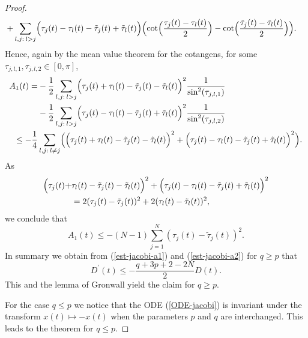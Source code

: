 \documentclass[10pt,a4paper]{amsart}
\begin{document}
\begin{proof}
\begin{align}
+&
  \sum_{l,j: \> l> j}\Bigl( \tau_j(t)- \tau_l(t) -\tilde \tau_j(t)+\tilde \tau_l(t)\Bigr)
 \Bigl(\cot\Bigl(\frac{\tau_j(t)-\tau_l(t)}{2}\Bigr)-
\cot\Bigl(\frac{\tilde \tau_j(t)-\tilde \tau_l(t)}{2}\Bigr)\Bigr).\notag
\end{align}
Hence, again by the mean value theorem for the cotangens, for some $\tau_{j,l,1},\tau_{j,l,2}\in [0,\pi]$,
\begin{align}
  A_1(t)= & -\frac{1}{2} \sum_{l,j: \> l>j}\Bigl( \tau_j(t)+ \tau_l(t) -\tilde \tau_j(t)-\tilde \tau_l(t)\Bigr)^2\frac{1}{\sin^2( \tau_{j,l,1})}
\notag\\
&-\frac{1}{2} \sum_{l,j: \> l>j}\Bigl( \tau_j(t)- \tau_l(t) -\tilde \tau_j(t)+\tilde \tau_l(t)\Bigr)^2\frac{1}{\sin^2( \tau_{j,l,2})}\notag\\
\le  -\frac{1}{4} &\sum_{l,j: \> l\ne j}\Bigl(\Bigl( \tau_j(t)+ \tau_l(t) -\tilde \tau_j(t)-\tilde \tau_l(t)\Bigr)^2
+\Bigl( \tau_j(t)- \tau_l(t) -\tilde \tau_j(t)+\tilde \tau_l(t)\Bigr)^2\Bigr).\notag
\end{align}
As
\begin{align}
  \Bigl( \tau_j(t)+ &\tau_l(t) -\tilde \tau_j(t)-\tilde \tau_l(t)\Bigr)^2+
  \Bigl( \tau_j(t)-\tau_l(t) -\tilde \tau_j(t)+\tilde \tau_l(t)\Bigr)^2\notag\\
&= 2(\tau_j(t)-\tilde \tau_j(t))^2 +2(\tau_l(t)-\tilde \tau_l(t))^2,\end{align}
we conclude that
\begin{equation}\label{est-jacobi-a1}
  A_1(t)\le -(N-1)\sum_{j=1}^N (\tau_j(t)-\tilde \tau_j(t))^2.\end{equation}
In summary we obtain from (\ref{est-jacobi-a1}) and (\ref{est-jacobi-a2}) for $q\ge p$ that
$$D^\prime(t) \le   -\frac{q+3p+2-2N}{2} D(t).$$
This and the lemma of Gronwall yield the claim for $q\ge p$.

For the case $q\le p$ we notice that the ODE (\ref{ODE-jacobi}) is invariant under the transform $x(t)\mapsto -x(t)$
when the parameters $p$ and $q$ are interchanged. This leads to the theorem for $q\le p$.
 \end{proof}
\end{document}
